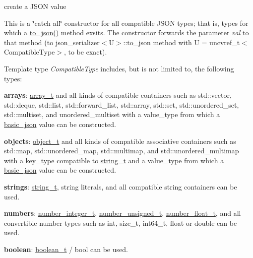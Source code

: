 create a J\+S\+ON value 

This is a \char`\"{}catch all\char`\"{} constructor for all compatible J\+S\+ON types; that is, types for which a {\ttfamily \mbox{\hyperlink{namespacenlohmann_1_1detail_a6fa2f784014bfc0b62d7a35d51e676c9}{to\+\_\+json()}}} method exsits. The constructor forwards the parameter {\itshape val} to that method (to {\ttfamily json\+\_\+serializer$<$U$>$\+::to\+\_\+json} method with {\ttfamily U = uncvref\+\_\+t$<$Compatible\+Type$>$}, to be exact).

Template type {\itshape Compatible\+Type} includes, but is not limited to, the following types\+:
\begin{DoxyItemize}
\item {\bfseries{arrays}}\+: \mbox{\hyperlink{classnlohmann_1_1basic__json_ae095578e03df97c5b3991787f1056374}{array\+\_\+t}} and all kinds of compatible containers such as {\ttfamily std\+::vector}, {\ttfamily std\+::deque}, {\ttfamily std\+::list}, {\ttfamily std\+::forward\+\_\+list}, {\ttfamily std\+::array}, {\ttfamily std\+::set}, {\ttfamily std\+::unordered\+\_\+set}, {\ttfamily std\+::multiset}, and {\ttfamily unordered\+\_\+multiset} with a {\ttfamily value\+\_\+type} from which a \mbox{\hyperlink{classnlohmann_1_1basic__json}{basic\+\_\+json}} value can be constructed.
\item {\bfseries{objects}}\+: \mbox{\hyperlink{classnlohmann_1_1basic__json_aa1eb13d5aa86f80cbee6c58e90fbaf49}{object\+\_\+t}} and all kinds of compatible associative containers such as {\ttfamily std\+::map}, {\ttfamily std\+::unordered\+\_\+map}, {\ttfamily std\+::multimap}, and {\ttfamily std\+::unordered\+\_\+multimap} with a {\ttfamily key\+\_\+type} compatible to \mbox{\hyperlink{classnlohmann_1_1basic__json_a61f8566a1a85a424c7266fb531dca005}{string\+\_\+t}} and a {\ttfamily value\+\_\+type} from which a \mbox{\hyperlink{classnlohmann_1_1basic__json}{basic\+\_\+json}} value can be constructed.
\item {\bfseries{strings}}\+: \mbox{\hyperlink{classnlohmann_1_1basic__json_a61f8566a1a85a424c7266fb531dca005}{string\+\_\+t}}, string literals, and all compatible string containers can be used.
\item {\bfseries{numbers}}\+: \mbox{\hyperlink{classnlohmann_1_1basic__json_a98e611d67b7bd75307de99c9358ab2dc}{number\+\_\+integer\+\_\+t}}, \mbox{\hyperlink{classnlohmann_1_1basic__json_ab906e29b5d83ac162e823ada2156b989}{number\+\_\+unsigned\+\_\+t}}, \mbox{\hyperlink{classnlohmann_1_1basic__json_a88d6103cb3620410b35200ee8e313d97}{number\+\_\+float\+\_\+t}}, and all convertible number types such as {\ttfamily int}, {\ttfamily size\+\_\+t}, {\ttfamily int64\+\_\+t}, {\ttfamily float} or {\ttfamily double} can be used.
\item {\bfseries{boolean}}\+: \mbox{\hyperlink{classnlohmann_1_1basic__json_a4c919102a9b4fe0d588af64801436082}{boolean\+\_\+t}} / {\ttfamily bool} can be used.
\end{DoxyItemize}

